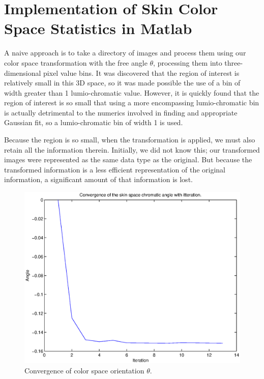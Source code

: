 \section{Implementation of Skin Color Space Statistics in Matlab}\label{sec:SkinColorSpaceStatsMatlab}

A naive approach is to take a directory of images and process them using our color space transformation with the free angle $\theta$, processing them into three-dimensional pixel value bins. It was discovered that the region of interest is relatively small in this 3D space, so it was made possible the use of a bin of width greater than 1 lumio-chromatic value. However, it is quickly found that the region of interest is so small that using a more encompassing lumio-chromatic bin is actually detrimental to the numerics involved in finding and appropriate Gaussian fit, so a lumio-chromatic bin of width 1 is used.

Because the region is so small, when the transformation is applied, we must also retain all the information therein. Initially, we did not know this; our transformed images were represented as the same data type as the original. But because the transformed information is a less efficient representation of the original information, a significant amount of that information is lost.

\begin{figure}[h!]
  \centering
    \includegraphics[width=\textwidth]{Chapter3/Figs/ConvergenceOfSkinSpaceFinal.eps}
    \caption{Convergence of color space orientation $\theta$.}  \label{fig:ConvergenceTheta}
\end{figure}


